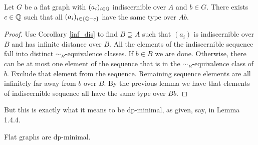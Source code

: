 \begin{Theorem}
  Let $G$ be a flat graph with $(a_i)_{i\in\mathbb{Q}}$ indiscernible over $A$ and $b \in G$.
  There exists $c \in \mathbb{Q}$ such that all $(a_i)_{i\in\{\mathbb{Q} - c\}}$ have the same type over $Ab$.
\end{Theorem}

\begin{proof}
  Use Corollary \ref{inf_dis} to find $B \supseteq A$ such that $(a_i)$ is indiscernible over $B$ and has infinite distance over $B$.
  All the elements of the indiscernible sequence fall into distinct $\sim_B$-equivalence classes.
  If $b \in B$ we are done.
  Otherwise, there can be at most one element of the sequence that is in the $\sim_B$-equivalence class of $b$.
  Exclude that element from the sequence.
  Remaining sequence elements are all infinitely far away from $b$ over $B$.
  By the previous lemma we have that elements of indiscernible sequence all have the same type over $Bb$.
\end{proof}

But this is exactly what it means to be dp-minimal, as given, say, in \cite{simon_dp_min} Lemma 1.4.4.

\begin{Corollary}
  Flat graphs are dp-minimal.
\end{Corollary}

